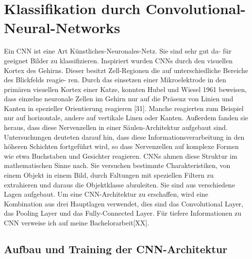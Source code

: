 {{{{{{{{\begin{center}
\end{center}


\section{Klassifikation durch Convolutional-Neural-Networks}
\label{sec:Klassifikation durch Convolutional-Neural-Networks}

Ein CNN ist eine Art K\"unstliches-Neuronales-Netz. Sie sind sehr gut da-
f\"ur geeignet Bilder zu klassifizieren. Inspiriert wurden CNNs durch den visuellen Kortex des Gehirns. Dieser besitzt Zell-Regionen die auf unterschiedliche Bereiche des Blickfelds reagie-
ren. Durch das einsetzen einer Mikroelektrode in den prim\"aren visuellen Kortex einer Katze,
konnten Hubel und Wiesel 1961 beweisen, dass einzelne neuronale Zellen im Gehirn nur auf die
Pr\"asenz von Linien und Kanten in spezieller Orientierung reagieren [31]. Manche reagierten
zum Beispiel nur auf horizontale, andere auf vertikale Linen oder Kanten. Au{\ss}erdem fanden sie
heraus, dass diese Nervenzellen in einer S\"aulen-Architektur aufgebaut sind. Untersuchungen
deuteten darauf hin, dass diese Informationsverarbeitung in den h\"oheren Schichten fortgef\"uhrt
wird, so dass Nervenzellen auf komplexe Formen wie etwa Buchstaben und Gesichter reagieren. CNNs ahmen diese Struktur im mathematischen Sinne nach. Sie versuchen bestimmte
Charakteristiken, von einem Objekt in einem Bild, durch Faltungen mit speziellen Filtern zu
extrahieren und daraus die Objektklasse abzuleiten. Sie sind aus verschiedene Lagen aufgebaut. Um eine CNN-Architektur zu erschaffen, wird eine Kombination aus drei Hauptlagen
verwendet, dies sind das Convolutional Layer, das Pooling Layer und das Fully-Connected
Layer. F\"ur tiefere Informationen zu CNN verweise ich auf meine Bachelorarbeit[XX].


\subsection{Aufbau und Training der CNN-Architektur}
\label{subsec:Aufbau und Training der CNN-Architektur}

}}}}}}}}
